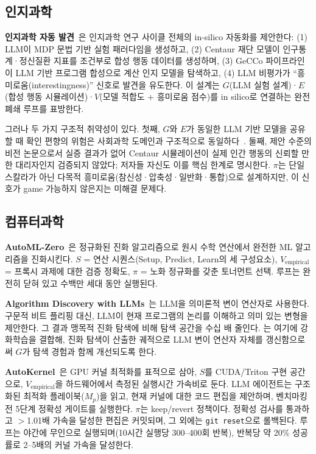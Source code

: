 \documentclass[11pt]{article}
\begin{document}
\subsection{인지과학}

\textbf{인지과학 자동 발견}~\citep{jagadish2026cogscidiscovery}은 인지과학 연구 사이클 전체의 in-silico 자동화를 제안한다: (1) LLM이 MDP 문법 기반 실험 패러다임을 생성하고, (2) Centaur 재단 모델이 인구통계·정신질환 지표를 조건부로 합성 행동 데이터를 생성하며, (3) GeCCo 파이프라인이 LLM 기반 프로그램 합성으로 계산 인지 모델을 탐색하고, (4) LLM 비평가가 ``흥미로움(interestingness)'' 신호로 발견을 유도한다. 이 설계는 $G$(LLM 실험 설계)·$E$(합성 행동 시뮬레이션)·$V$(모델 적합도 + 흥미로움 점수)를 in silico로 연결하는 완전 폐쇄 루프를 표방한다.

그러나 두 가지 구조적 취약성이 있다. 첫째, $G$와 $E$가 동일한 LLM 기반 모델을 공유할 때 확인 편향의 위험은 사회과학 도메인과 구조적으로 동일하다~\citep{manning2024automated,aher2023turing}. 둘째, 제안 수준의 비전 논문으로서 실증 결과가 없어 Centaur 시뮬레이션이 실제 인간 행동의 신뢰할 만한 대리자인지 검증되지 않았다; 저자들 자신도 이를 핵심 한계로 명시한다. $\pi$는 단일 스칼라가 아닌 다목적 흥미로움(참신성·압축성·일반화·통합)으로 설계하지만, 이 신호가 game 가능하지 않은지는 미해결 문제다.

\subsection{컴퓨터과학}

\textbf{AutoML-Zero}~\citep{real2020automlzero}은 정규화된 진화 알고리즘으로 원시 수학 연산에서 완전한 ML 알고리즘을 진화시킨다. $S$ = 연산 시퀀스(Setup, Predict, Learn의 세 구성요소), $V_\text{empirical}$ = 프록시 과제에 대한 검증 정확도, $\pi$ = 노화 정규화를 갖춘 토너먼트 선택. 루프는 완전히 닫혀 있고 수백만 세대 동안 실행된다.

\textbf{Algorithm Discovery with LLMs}~\citep{sartori2024algodiscovery}는 LLM을 의미론적 변이 연산자로 사용한다. 구문적 비트 플리핑 대신, LLM이 현재 프로그램의 논리를 이해하고 의미 있는 변형을 제안한다. 그 결과 맹목적 진화 탐색에 비해 탐색 공간을 수십 배 줄인다. \citet{surina2025algodiscovery}는 여기에 강화학습을 결합해, 진화 탐색이 산출한 궤적으로 LLM 변이 연산자 자체를 갱신함으로써 $G$가 탐색 경험과 함께 개선되도록 한다.

\textbf{AutoKernel}~\citep{jaber2026autokernel}은 GPU 커널 최적화를 표적으로 삼아, $S$를 CUDA/Triton 구현 공간으로, $V_\text{empirical}$을 하드웨어에서 측정된 실행시간 가속비로 둔다. LLM 에이전트는 구조화된 최적화 플레이북($M_p$)을 읽고, 현재 커널에 대한 코드 편집을 제안하며, 벤치마킹 전 5단계 정확성 게이트를 실행한다. $\pi$는 keep/revert 정책이다. 정확성 검사를 통과하고 $>$1.01배 가속을 달성한 편집은 커밋되며, 그 외에는 \texttt{git reset}으로 롤백된다. 루프는 야간에 무인으로 실행되며(10시간 실행당 300--400회 반복), 반복당 약 20\% 성공률로 2--5배의 커널 가속을 달성한다.
\end{document}
